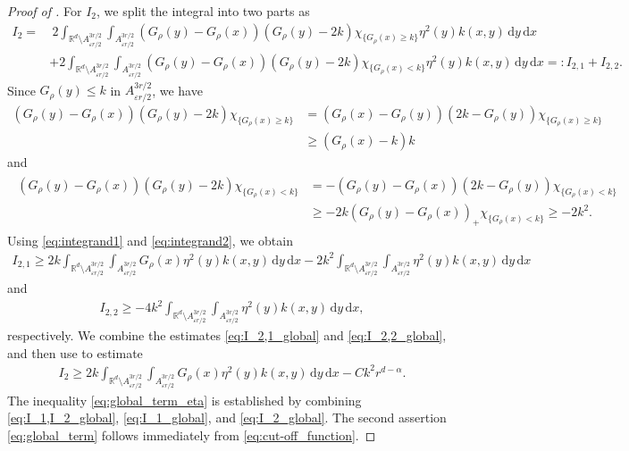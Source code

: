 \documentclass[reqno]{amsart}
\theoremstyle{plain}
\theoremstyle{definition}
\numberwithin{equation}{section}
\newcommand{\Rd}{\mathbb{R}^d}
\newcommand{\dx} {\, \mathrm{d}x}
\newcommand{\dy} {\, \mathrm{d}y}
\begin{document}
\begin{proof} [Proof of ]
For $I_2$, we split the integral into two parts as
\begin{align*}
I_2
=&~ 2\int_{\Rd \setminus A^{3r/2}_{\varepsilon r/2}} \int_{A^{3r/2}_{\varepsilon r/2}}
(G_{\rho}(y) - G_{\rho}(x))(G_{\rho}(y)-2k) \chi_{\lbrace G_{\rho}(x) \geq k \rbrace} \eta^2(y) k(x,y) \dy \dx \\
&+ 2\int_{\Rd \setminus A^{3r/2}_{\varepsilon r/2}} \int_{A^{3r/2}_{\varepsilon r/2}}
(G_{\rho}(y) - G_{\rho}(x))(G_{\rho}(y)-2k) \chi_{\lbrace G_{\rho}(x) < k \rbrace} \eta^2(y) k(x,y) \dy \dx 
=: I_{2,1} + I_{2,2}.
\end{align*}
Since $G_{\rho}(y) \leq k$ in $A^{3r/2}_{\varepsilon r/2}$, we have
\begin{align} \label{eq:integrand1}
(G_{\rho}(y) - G_{\rho}(x))(G_{\rho}(y)-2k) \chi_{\lbrace G_{\rho}(x) \geq k \rbrace} 
&= (G_{\rho}(x) - G_{\rho}(y))(2k - G_{\rho}(y)) \chi_{\lbrace G_{\rho}(x) \geq k \rbrace} \\
&\geq (G_{\rho}(x) - k)k
\end{align}
and
\begin{align} \label{eq:integrand2}
\begin{split}
(G_{\rho}(y) - G_{\rho}(x))(G_{\rho}(y)-2k) \chi_{\lbrace G_{\rho}(x) < k \rbrace}
&= -(G_{\rho}(y) - G_{\rho}(x)) (2k - G_{\rho}(y)) \chi_{\lbrace G_{\rho}(x) < k \rbrace} \\
&\geq -2k(G_{\rho}(y) - G_{\rho}(x))_+ \chi_{\lbrace G_{\rho}(x) < k \rbrace} \geq -2k^2.
\end{split}
\end{align}
Using \eqref{eq:integrand1} and \eqref{eq:integrand2}, we obtain
\begin{align} \label{eq:I_2,1_global}
I_{2,1} 
\geq 2k\int_{\Rd \setminus A^{3r/2}_{\varepsilon r/2}} 
\int_{A^{3r/2}_{\varepsilon r/2}} G_{\rho}(x) \eta^2(y) k(x,y) \dy \dx 
- 2k^2 \int_{\Rd \setminus A^{3r/2}_{\varepsilon r/2}} 
\int_{A^{3r/2}_{\varepsilon r/2}} \eta^2(y) k(x,y) \dy \dx
\end{align}
and
\begin{align} \label{eq:I_2,2_global}
I_{2,2} \geq -4k^2 \int_{\Rd \setminus A^{3r/2}_{\varepsilon r/2}} 
\int_{A^{3r/2}_{\varepsilon r/2}} \eta^2(y) k(x,y) \dy \dx,
\end{align}
respectively. 
We combine the estimates \eqref{eq:I_2,1_global} and \eqref{eq:I_2,2_global}, 
and then use  to estimate
\begin{align} \label{eq:I_2_global}
I_2
\geq 2k\int_{\Rd \setminus A^{3r/2}_{\varepsilon r/2}} 
\int_{A^{3r/2}_{\varepsilon r/2}} G_{\rho}(x) \eta^2(y) k(x,y) \dy \dx 
- Ck^2 r^{d-\alpha}.
\end{align}
The inequality \eqref{eq:global_term_eta} is established by combining
\eqref{eq:I_1,I_2_global}, \eqref{eq:I_1_global}, and \eqref{eq:I_2_global}. 
The second assertion \eqref{eq:global_term} follows immediately from 
\eqref{eq:cut-off_function}.
\end{proof}
\end{document}
